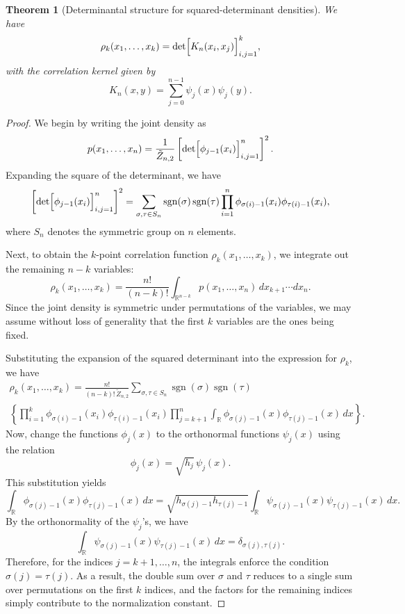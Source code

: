 \documentclass[letterpaper,11pt,oneside,reqno]{article}
\numberwithin{equation}{section}
\newtheorem{theorem}[proposition]{Theorem}
\theoremstyle{definition}
\begin{document}
\begin{theorem}[Determinantal structure for squared-determinant densities]
\label{thm:determinantal}
We have
\[
\rho_k(x_1,\dots,x_k)=\det\Bigl[K_n(x_i,x_j)\Bigr]_{i,j=1}^k,
\]
with the correlation kernel given by
\[
K_n(x,y)=\sum_{j=0}^{n-1}\psi_j(x)\psi_j(y).
\]
\end{theorem}

\begin{proof}
We begin by writing the joint density as
\[
p(x_1,\dots,x_n)=\frac{1}{\tilde{Z}_{n,2}} \left[\det\Bigl[\phi_{j-1}(x_i)\Bigr]_{i,j=1}^n\right]^2.
\]
Expanding the square of the determinant, we have
\[
\left[\det\Bigl[\phi_{j-1}(x_i)\Bigr]_{i,j=1}^n\right]^2 = \sum_{\sigma,\tau\in S_n} \operatorname{sgn}(\sigma)\operatorname{sgn}(\tau) \prod_{i=1}^n \phi_{\sigma(i)-1}(x_i)\phi_{\tau(i)-1}(x_i),
\]
where $S_n$ denotes the symmetric group on $n$ elements.

Next, to obtain the $k$-point correlation function $\rho_k(x_1,\dots,x_k)$, we integrate out the remaining $n-k$ variables:
\[
\rho_k(x_1,\dots,x_k)=\frac{n!}{(n-k)!}\int_{\mathbb{R}^{n-k}} p(x_1,\dots,x_n)\,dx_{k+1}\cdots dx_n.
\]
Since the joint density is symmetric under permutations of the variables, we may assume without loss of generality that the first $k$ variables are the ones being fixed.

Substituting the expansion of the squared determinant into the expression for $\rho_k$, we have
\begin{multline*}
\rho_k(x_1,\dots,x_k)=\frac{n!}{(n-k)!\,\tilde{Z}_{n,2}} \sum_{\sigma,\tau\in S_n} \operatorname{sgn}(\sigma)\operatorname{sgn}(\tau) \\
\left\{ \prod_{i=1}^k \phi_{\sigma(i)-1}(x_i)\phi_{\tau(i)-1}(x_i) \prod_{j=k+1}^n \int_{\mathbb{R}} \phi_{\sigma(j)-1}(x)\phi_{\tau(j)-1}(x)\,dx \right\}.
\end{multline*}
Now, change the functions $\phi_j(x)$ to the orthonormal functions $\psi_j(x)$ using the relation
\[
\phi_j(x)=\sqrt{h_j}\,\psi_j(x).
\]
This substitution yields 
\[
\int_{\mathbb{R}} \phi_{\sigma(j)-1}(x)\phi_{\tau(j)-1}(x)\,dx = \sqrt{h_{\sigma(j)-1}h_{\tau(j)-1}} \int_{\mathbb{R}} \psi_{\sigma(j)-1}(x)\psi_{\tau(j)-1}(x)\,dx.
\]
By the orthonormality of the $\psi_j$'s, we have
\[
\int_{\mathbb{R}} \psi_{\sigma(j)-1}(x)\psi_{\tau(j)-1}(x)\,dx = \delta_{\sigma(j),\tau(j)}.
\]
Therefore, for the indices $j=k+1,\dots,n$, the integrals enforce the condition $\sigma(j)=\tau(j)$. As a result, the double sum over $\sigma$ and $\tau$ reduces to a single sum over permutations on the first $k$ indices, and the factors for the remaining indices simply contribute to the normalization constant.


\end{proof}
\end{document}
